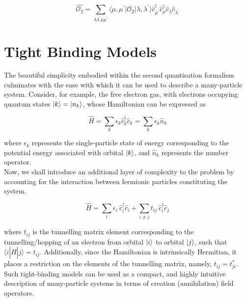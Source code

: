 \begin{equation}
    \hat{\mathcal{O}_{2}} = \sum_{\lambda \lambda^{\prime} \mu \mu^{\prime}} \langle \mu, \mu^{\prime}|\mathcal{O}_{2}|\lambda, \lambda^{\prime}\rangle \hat{c}_{\mu^{\prime}}^{\dagger} \hat{c}_{\mu}^{\dagger} \hat{c}_{\lambda} \hat{c}_{\lambda^{\prime}}
\end{equation}


\section{Tight Binding Models}

The beautiful simplicity embodied within the second quantisation formalism culminates with the ease with which it can be used to describe a many-particle system. Consider, for example, the free electron gas, with electrons occupying quantum states $\ket{k} = \ket{n_{k}}$, whose Hamiltonian can be expressed as

\begin{equation}
    \hat{H} = \sum_{k}\epsilon_{k}\hat{c}_{k}^{\dagger}\hat{c}_{k} = \sum_{k}\epsilon_{k}\hat{n}_{k}
\end{equation}

where $\epsilon_{k}$ represents the single-particle state of energy corresponding to the potential energy associated with orbital $\ket{k}$, and $\hat{n}_{k}$ represents the number operator. \\

Now, we shall introduce an additional layer of complexity to the problem by accounting for the interaction between fermionic particles constituting the system.

\begin{equation}
    \hat{H} = \sum_{i}\epsilon_{i} \: \hat{c}_{i}^{\dagger} \hat{c}_{i} + \sum_{i \neq j}t_{ij} \: \hat{c}_{i}^{\dagger} \hat{c}_{j}
\end{equation}

where $t_{ij}$ is the tunnelling matrix element corresponding to the tunnelling/hopping of an electron from orbital $\ket{i}$ to orbital $\ket{j}$, such that $\langle i|\hat{H}|j \rangle = t_{ij}$. Additionally, since the Hamiltonian is intrinsically Hermitian, it places a restriction on the elements of the tunnelling matrix, namely, $t_{ij} = t_{ji}^{*}$. Such tight-binding models can be used as a compact, and highly intuitive description of many-particle systems in terms of creation (annihilation) field operators. \\

